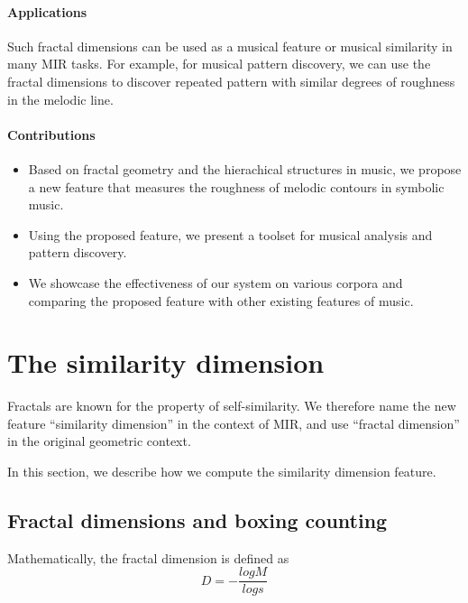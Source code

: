 \documentclass[acmsmall,review,anonymous]{acmart}\settopmatter{printfolios=true,printccs=false,printacmref=false}
\begin{document}
\paragraph{Applications}
Such fractal dimensions can be used as a musical feature or musical similarity in many MIR
tasks. For example, for musical pattern discovery, we can use the fractal
dimensions to discover repeated pattern with similar degrees of roughness in the
melodic line. 


\paragraph{Contributions}
\begin{itemize}
\item  Based on fractal geometry and the hierachical structures in music, we propose a
new feature that measures the roughness of melodic contours in symbolic music.
\item  Using the proposed feature, we present a toolset for musical analysis and
  pattern discovery.
\item  We showcase the effectiveness of our system on various
corpora and comparing the proposed feature with other existing features of music. 

\end{itemize}

\section{The similarity dimension}
Fractals are known for the property of self-similarity. We therefore name the
new feature ``similarity dimension'' in the context of MIR, and use ``fractal
dimension'' in the original geometric context.

In this section, we describe how we compute the similarity dimension feature.

\subsection{Fractal dimensions and boxing counting}
Mathematically, the fractal dimension is defined as $$D=-\frac{logM}{logs}$$
\end{document}
